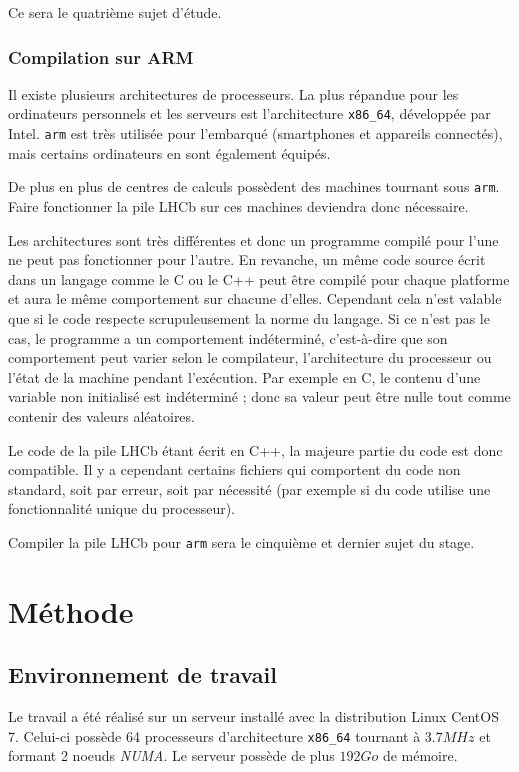 \documentclass[a4paper,11pt]{report}
\begin{document}
\bigskip
Ce sera le quatrième sujet d'étude.

\subsection{Compilation sur ARM}\label{section:arm}
Il existe plusieurs architectures de processeurs.
La plus répandue pour les ordinateurs personnels et les serveurs est l'architecture \verb'x86_64', développée par Intel.
\verb'arm' est très utilisée pour l'embarqué (smartphones et appareils connectés), mais certains ordinateurs en sont également équipés.

De plus en plus de centres de calculs possèdent des machines tournant sous \verb'arm'.
Faire fonctionner la pile LHCb sur ces machines deviendra donc nécessaire.

Les architectures sont très différentes et donc un programme compilé pour l'une ne peut pas fonctionner pour l'autre.
En revanche, un même code source écrit dans un langage comme le C ou le C++ peut être compilé pour chaque platforme et aura le même comportement sur chacune d'elles.
Cependant cela n'est valable que si le code respecte scrupuleusement la norme du langage.
Si ce n'est pas le cas, le programme a un comportement indéterminé, c'est-à-dire que son comportement peut varier selon le compilateur, l'architecture du processeur ou l'état de la machine pendant l'exécution.
Par exemple en C, le contenu d'une variable non initialisé est indéterminé ; donc sa valeur peut être nulle tout comme contenir des valeurs aléatoires.

Le code de la pile LHCb étant écrit en C++, la majeure partie du code est donc compatible.
Il y a cependant certains fichiers qui comportent du code non standard, soit par erreur, soit par nécessité (par exemple si du code utilise une fonctionnalité unique du processeur).

\bigskip
Compiler la pile LHCb pour \verb'arm' sera le cinquième et dernier sujet du stage.


\chapter{Méthode}
\section{Environnement de travail}
Le travail a été réalisé sur un serveur installé avec la distribution Linux CentOS 7.
Celui-ci possède 64 processeurs d'architecture \verb'x86_64' tournant à $3.7 MHz$ et formant 2 noeuds \emph{NUMA}.
Le serveur possède de plus $192 Go$ de mémoire.
\end{document}
